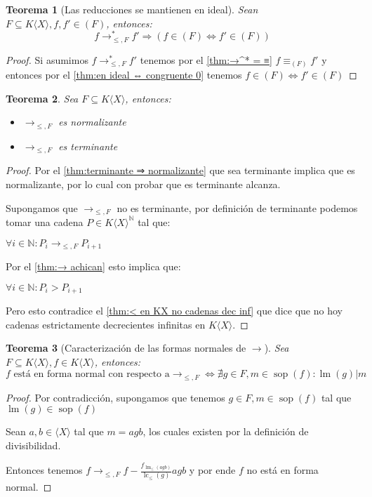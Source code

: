 \documentclass{amsbook} %
\theoremstyle{customstyle}
\newtheorem{theorem}{Teorema}[section]
\DeclareMathOperator{\sop}{sop}
\DeclareMathOperator{\lm}{lm}
\DeclareMathOperator{\lc}{lc}
\begin{document}
\begin{theorem}[Las reducciones se mantienen en ideal]\label{thm:→ mantiene pertenencia a ideal}
Sean $F ⊆ K⟨X⟩, f, f' ∈ (F)$, entonces:
\[ f →^*_{≤, F} f' ⇒ (f ∈ (F) ⇔ f' ∈ (F)) \]
\end{theorem}
\begin{proof}
Si asumimos $f →^*_{≤, F} f'$ tenemos por el \cref{thm:→^* = ≡} $f ≡_{(F)} f'$ y entonces por el \cref{thm:en ideal ⇔ congruente 0} tenemos $f ∈ (F) ⇔ f' ∈ (F)$
\end{proof}

\begin{theorem}
Sea $F ⊆ K⟨X⟩$, entonces:
\begin{itemize}
\item $→_{≤, F}$ es normalizante
\item $→_{≤, F}$ es terminante
\end{itemize}
\end{theorem}
\begin{proof}
Por el \cref{thm:terminante ⇒ normalizante} que sea terminante implica que es normalizante, por lo cual con probar que es terminante alcanza.

Supongamos que $→_{≤, F}$ no es terminante, por definición de terminante podemos tomar una cadena $P ∈ K⟨X⟩^ℕ$ tal que:

$∀i ∈ ℕ : P_i →_{≤, F} P_{i+1}$

Por el \cref{thm:→ achican} esto implica que:

$∀i ∈ ℕ : P_i > P_{i+1}$

Pero esto contradice el \cref{thm:< en KX no cadenas dec inf} que dice que no hoy cadenas estrictamente decrecientes infinitas en $K⟨X⟩$.

\end{proof}

\begin{theorem}[Caracterización de las formas normales de $→$]
Sea $F ⊆ K⟨X⟩, f ∈ K⟨X⟩$, entonces: %
\[ f\text{ está en forma normal con respecto a} →_{≤, F} ⇔ ∄g ∈ F, m ∈ \sop(f) : \lm(g) | m \]
\end{theorem}
\begin{proof}
Por contradicción, supongamos que tenemos $g ∈ F, m ∈ \sop(f)$ tal que $\lm(g) ∈ \sop(f)$

Sean $a, b ∈ ⟨X⟩$ tal que $m = agb$, los cuales existen por la definición de divisibilidad.

Entonces tenemos $f →_{≤, F} f - \frac{f_{\lm_≤(agb)}}{\lc_≤(g)}agb$ y por ende $f$ no está en forma normal.

\end{proof}
\end{document}
